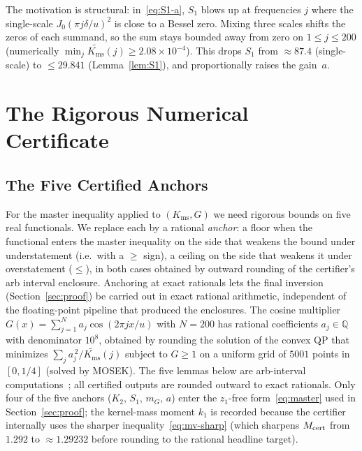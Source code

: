 \documentclass[11pt, letterpaper]{article}
\theoremstyle{paperplain}
\theoremstyle{paperdef}
\newcommand{\Q}{\mathbb{Q}}
\newcommand{\Kms}{K_{\mathrm{ms}}}
\begin{document}
The motivation is structural: in~\eqref{eq:S1-a}, $S_1$ blows up at
frequencies $j$ where the single-scale $J_0(\pi j\delta/u)^2$ is close
to a Bessel zero.  Mixing three scales shifts the zeros of each
summand, so the sum stays bounded away from zero on $1\le j\le 200$
(numerically $\min_j\widetilde{\Kms}(j)\ge 2.08\times 10^{-4}$).  This
drops $S_1$ from $\approx 87.4$ (single-scale) to $\le 29.841$
(Lemma~\ref{lem:S1}), and proportionally raises the gain~$a$.

\section{The Rigorous Numerical Certificate}\label{sec:cert}

\subsection{The Five Certified Anchors}\label{subsec:cert-anchors}

For the master inequality applied to $(\Kms,G)$ we need rigorous
bounds on five real functionals.  We replace each by a rational
\emph{anchor}: a floor when the functional enters the master
inequality on the side that weakens the bound under understatement
(i.e.\ with a $\ge$ sign), a ceiling on the side that weakens it
under overstatement ($\le$), in both cases obtained by outward
rounding of the certifier's arb interval enclosure.  Anchoring at
exact rationals lets the final inversion (Section~\ref{sec:proof}) be
carried out in exact rational arithmetic, independent of the
floating-point pipeline that produced the enclosures.  The cosine multiplier
$G(x)=\sum_{j=1}^{N}a_j\cos(2\pi jx/u)$ with $N=200$ has rational
coefficients $a_j\in\Q$ with denominator $10^{8}$, obtained by
rounding the solution of the convex QP that minimizes
$\sum_j a_j^{\,2}/\widetilde{\Kms}(j)$ subject to $G\ge 1$ on a
uniform grid of $5001$ points in $[0, 1/4]$ (solved by MOSEK).  The
five lemmas below are arb-interval computations~\cite{Flint}; all
certified outputs are rounded outward to exact rationals.  Only four
of the five anchors ($K_2$, $S_1$, $m_G$, $a$) enter the
$z_1$-free form~\eqref{eq:master} used in Section~\ref{sec:proof};
the kernel-mass moment $k_1$ is recorded because the certifier
internally uses the sharper inequality~\eqref{eq:mv-sharp} (which
sharpens $M_{\rm cert}$ from $1.292$ to $\approx 1.29232$ before
rounding to the rational headline target).
\end{document}
